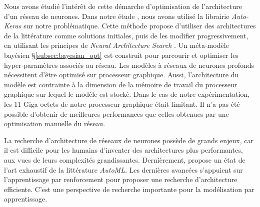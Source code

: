 Nous avons étudié l'intérêt de cette démarche d'optimisation de l'architecture d'un réseau de neurones.
Dans notre étude \cite{nagorny_polarimetric_2019}, nous avons utilisé la librairie \textit{Auto-Keras} \cite{jin_autokeras_2018} sur notre problématique.
Cette méthode propose d'utiliser des architectures de la littérature comme solutions initiales, puis de les modifier progressivement, en utilisant les principes de \textit{Neural Architecture Search} \cite{zoph_neural_2016}.
Un méta-modèle bayésien §\ref{subsec:bayesian_opt} est construit pour parcourir et optimiser les hyper-paramètres associés au réseau.
Les modèles à réseaux de neurones profonds nécessitent d'être optimisé sur processeur graphique.
Aussi, l'architecture du modèle est contrainte à la dimension de la mémoire de travail du processeur graphique sur lequel le modèle est stocké.
Dans le cas de notre expérimentation, les 11 Giga octets de notre processeur graphique était limitant.
Il n'a pas été possible d'obtenir de meilleures performances que celles obtenues par une optimisation manuelle du réseau.

La recherche d'architecture de réseaux de neurones possède de grands enjeux, car il est difficile pour les humains d'inventer des architectures plus performantes, aux vues de leurs complexités grandissantes.
Dernièrement, \cite{elsken_neural_2018} propose un état de l'art exhaustif de la littérature \textit{AutoML}.
Les dernières avancées s'appuient sur l'apprentissage par renforcement pour proposer une recherche d'architecture efficiente.
C'est une perspective de recherche importante pour la modélisation par apprentissage.

\bigskip

\bigskip

